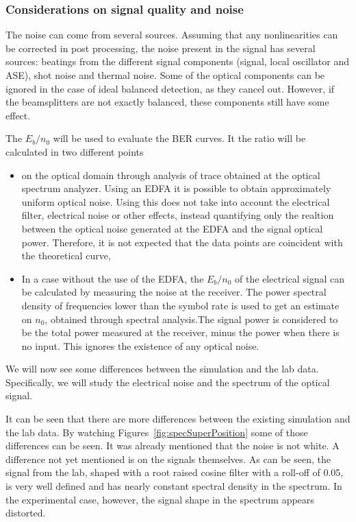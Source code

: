 	\subsubsection{Considerations on signal quality and noise}
	The noise can come from several sources. Assuming that any nonlinearities can
	be corrected in post processing, the noise present in the signal has several
	sources: beatings from the different signal components (signal, local
	oscillator and ASE), shot noise and thermal noise. Some of the optical
	components can be ignored in the case of ideal balanced detection, as they
	cancel out. However, if the beamsplitters are not exactly balanced, these
	components still have some effect.

	The $E_b/n_0$ will be used to evaluate the BER curves.
	It the ratio will be calculated in two different points

	\begin{itemize}
		\item on the optical domain through analysis of trace
			obtained at the optical spectrum analyzer. Using an EDFA it is possible to
			obtain approximately uniform optical noise. Using this does not take into
			account the electrical filter, electrical noise or other effects, instead
			quantifying only the realtion between the optical noise generated at the
			EDFA and the signal optical power. Therefore, it is not expected that the
			data points are coincident with the theoretical curve,
		\item In a case without the use of the EDFA, the $E_b/n_0$ of the electrical
			signal can be calculated by measuring the noise at the receiver.
			The power spectral density of frequencies lower than the symbol rate is
			used to get an estimate on $n_0$, obtained through spectral analysis.The
			signal power is considered to be the total power measured at the receiver,
			minus the power when there is no input. This ignores the existence of any
			optical noise.
	\end{itemize}

	We will now see some differences between the simulation and the lab data.
	Specifically, we will study the electrical noise and the spectrum of the
	optical signal.

	It can be seen that there are more differences between the existing simulation
	and the lab data. By watching Figures~\ref{fig:specSuperPosition} some of
	those differences can be seen. It was already mentioned that the noise is not
	white. A difference not yet mentioned is on the signals themselves. As can be
	seen, the signal from the lab, shaped with a root raised cosine filter with a
	roll-off of 0.05, is very well defined and has nearly constant spectral
	density in the spectrum. In the experimental case, however, the signal shape
	in the spectrum appears distorted.

